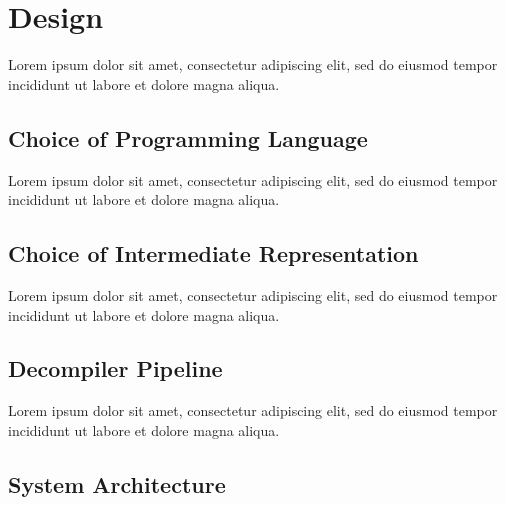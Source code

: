 \documentclass[12pt, a4paper]{article}
\begin{document}

\section{Design}

Lorem ipsum dolor sit amet, consectetur adipiscing elit, sed do eiusmod tempor incididunt ut labore et dolore magna aliqua.


\subsection{Choice of Programming Language}

Lorem ipsum dolor sit amet, consectetur adipiscing elit, sed do eiusmod tempor incididunt ut labore et dolore magna aliqua.




\subsection{Choice of Intermediate Representation}

Lorem ipsum dolor sit amet, consectetur adipiscing elit, sed do eiusmod tempor incididunt ut labore et dolore magna aliqua.


\subsection{Decompiler Pipeline}

Lorem ipsum dolor sit amet, consectetur adipiscing elit, sed do eiusmod tempor incididunt ut labore et dolore magna aliqua.


\subsection{System Architecture}
\end{document}
